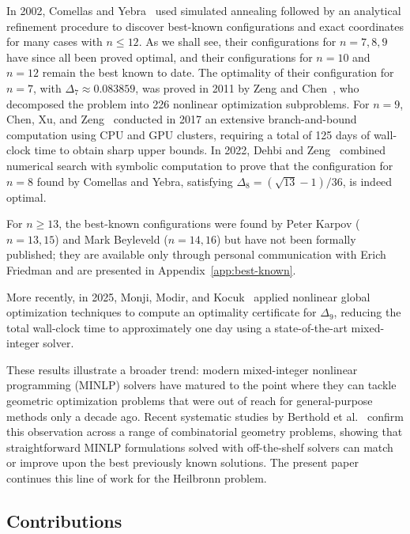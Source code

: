 \documentclass[11pt,a4paper]{article}
\theoremstyle{plain}
\theoremstyle{definition}
\theoremstyle{remark}
\begin{document}
In 2002, Comellas and Yebra~\cite{comellasyebra2002} used simulated annealing followed by an analytical refinement procedure to discover best-known configurations and exact coordinates for many cases with $n \le 12$.
As we shall see, their configurations for $n=7,8,9$ have since all been proved optimal, and their configurations for $n=10$ and $n=12$ remain the best known to date.
The optimality of their configuration for $n=7$, with $\Delta_7 \approx 0.083859$, was proved in 2011 by Zeng and Chen~\cite{ZengChen2011}, who decomposed the problem into 226 nonlinear optimization subproblems.
For $n=9$, Chen, Xu, and Zeng~\cite{chen2017searching} conducted in 2017 an extensive branch-and-bound computation using CPU and GPU clusters, requiring a total of 125 days of wall-clock time to obtain sharp upper bounds.
In 2022, Dehbi and Zeng~\cite{dehbi2022heilbronn} combined numerical search with symbolic computation to prove that the configuration for $n=8$ found by Comellas and Yebra, satisfying
$\Delta_8 = (\sqrt{13}-1)/36$,
is indeed optimal.

For $n \ge 13$, the best-known configurations were found by Peter Karpov ($n=13,15$) and Mark Beyleveld ($n=14,16$) but have not been formally published; they are available 
only through personal communication with Erich Friedman and are presented in Appendix~\ref{app:best-known}.

More recently, in 2025, Monji, Modir, and Kocuk~\cite{monji2025solvingheilbronntriangleproblem} applied nonlinear global optimization techniques to compute an optimality certificate for $\Delta_9$, reducing the total wall-clock time to approximately one day using a state-of-the-art mixed-integer solver.

These results illustrate a broader trend: modern mixed-integer nonlinear programming (MINLP) solvers have matured to the point where they can tackle geometric 
optimization problems that were out of reach for general-purpose methods only a decade ago. Recent systematic studies by Berthold et al.~\cite{berthold2026global,berthold2026outoftheboxglobaloptimizationpacking}
confirm this observation across a range of combinatorial geometry problems, showing that straightforward MINLP formulations solved with off-the-shelf solvers 
can match or improve upon the best previously known solutions.  The present paper continues this line of work for the Heilbronn problem. 

\subsection{Contributions}
\end{document}
